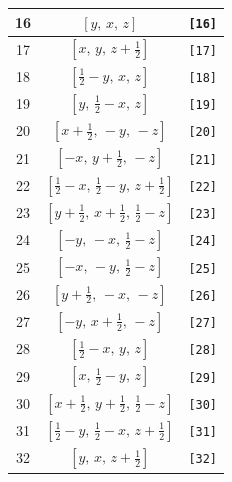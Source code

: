\documentclass[fleqn,8pt]{jsarticle}
\begin{document}
\begin{longtable}{ccc}
16 & $\left[ y,\, x,\, z \right]$ & {\tt [16]} \\ \hline
17 & $\left[ x,\, y,\, z + \frac{1}{2} \right]$ & {\tt [17]} \\ \hline
18 & $\left[ \frac{1}{2} - y,\, x,\, z \right]$ & {\tt [18]} \\ \hline
19 & $\left[ y,\, \frac{1}{2} - x,\, z \right]$ & {\tt [19]} \\ \hline
20 & $\left[ x + \frac{1}{2},\, - y,\, - z \right]$ & {\tt [20]} \\ \hline
21 & $\left[ - x,\, y + \frac{1}{2},\, - z \right]$ & {\tt [21]} \\ \hline
22 & $\left[ \frac{1}{2} - x,\, \frac{1}{2} - y,\, z + \frac{1}{2} \right]$ & {\tt [22]} \\ \hline
23 & $\left[ y + \frac{1}{2},\, x + \frac{1}{2},\, \frac{1}{2} - z \right]$ & {\tt [23]} \\ \hline
24 & $\left[ - y,\, - x,\, \frac{1}{2} - z \right]$ & {\tt [24]} \\ \hline
25 & $\left[ - x,\, - y,\, \frac{1}{2} - z \right]$ & {\tt [25]} \\ \hline
26 & $\left[ y + \frac{1}{2},\, - x,\, - z \right]$ & {\tt [26]} \\ \hline
27 & $\left[ - y,\, x + \frac{1}{2},\, - z \right]$ & {\tt [27]} \\ \hline
28 & $\left[ \frac{1}{2} - x,\, y,\, z \right]$ & {\tt [28]} \\ \hline
29 & $\left[ x,\, \frac{1}{2} - y,\, z \right]$ & {\tt [29]} \\ \hline
30 & $\left[ x + \frac{1}{2},\, y + \frac{1}{2},\, \frac{1}{2} - z \right]$ & {\tt [30]} \\ \hline
31 & $\left[ \frac{1}{2} - y,\, \frac{1}{2} - x,\, z + \frac{1}{2} \right]$ & {\tt [31]} \\ \hline
32 & $\left[ y,\, x,\, z + \frac{1}{2} \right]$ & {\tt [32]} \\
\end{longtable}
\end{document}
